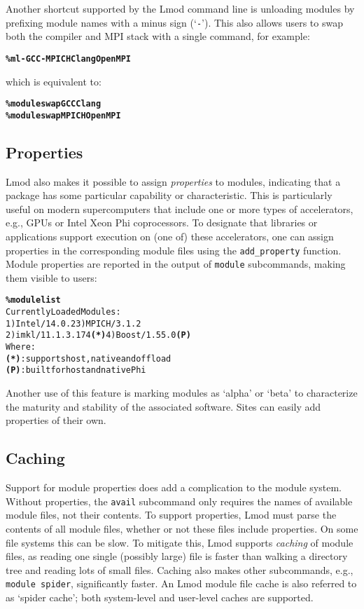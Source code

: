 Another shortcut supported by the Lmod command line is unloading modules by
prefixing module names with a minus sign (`\texttt{\small-}'). This also allows users to swap both the compiler and MPI stack with a single command, for example:
{\small
  \begin{alltt}
      \textbf{\% ml -GCC -MPICH Clang OpenMPI}\
  \end{alltt}
}
\noindent
which is equivalent to:{\small
  \begin{alltt}
      \textbf{\% module swap GCC Clang}
      \textbf{\% module swap MPICH OpenMPI}\
  \end{alltt}
}

\subsection{Properties}

Lmod also makes it possible to assign \emph{properties} to modules,
indicating that a package has some particular capability or
characteristic. This is particularly useful on modern supercomputers that include
one or more types of accelerators, e.g., GPUs or Intel Xeon Phi coprocessors.
To designate that libraries or applications support execution on (one of) these
accelerators, one can assign properties in the corresponding module files
using the \texttt{\small add\_property} function. 
Module properties are reported in the output of \texttt{\small module} subcommands,
making them visible to users:
{\small
\begin{alltt}
  \textbf{\% module list}
  Currently Loaded Modules:
    1) Intel/14.0.2        3) MPICH/3.1.2
    2) imkl/11.1.3.174 \textbf{(*)} 4) Boost/1.55.0 \textbf{(P)}
  Where:
   \textbf{(*)}:  supports host, native and offload
   \textbf{(P)}:  built for host and native Phi
\end{alltt}
}
\noindent Another use of this feature is marking modules as `alpha'
or `beta' to characterize the maturity and stability of the 
associated software. Sites can easily add properties of their own.

\subsection{Caching}

Support for module properties does add a complication to the module
system.  Without properties, the \texttt{\small avail} subcommand only requires the
names of available module files, not their contents.  To support properties, Lmod
must parse the contents of all module files, whether or not these files include
properties. On some file systems this can be slow.  To mitigate this, Lmod supports
\emph{caching} of module files, as reading one single (possibly large)
file is faster than walking a directory tree and reading lots of small files.
Caching also makes other subcommands, e.g., \texttt{\small module spider},
significantly faster. An Lmod module file cache is also referred to as
`spider cache'; both system-level and user-level caches are supported.

